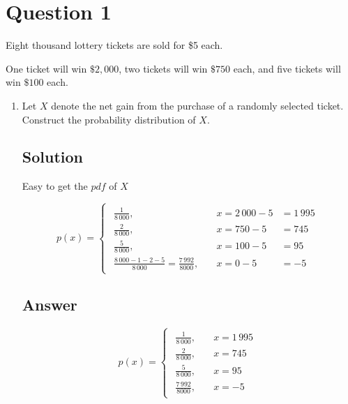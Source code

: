 \documentclass[12pt]{article}
\begin{document}
	
	\section*{Question 1}
	
	\noindent Eight thousand lottery tickets are sold for \$5 each.

	\bigskip
	
	\noindent One ticket will win $\$2,000$, two tickets will win $\$750$ each, and five tickets will win $\$100$ each.
	
	\bigskip
	
	\begin{enumerate}[start=1,label={\bfseries Part \arabic*:},leftmargin=0in]
		\bigskip\item Let $X$ denote the net gain from the purchase of a randomly selected ticket. Construct the probability distribution of $X$.
		
		\subsection*{Solution}
		
			Easy to get the $pdf$ of $X$
			
			\[
				p(x) =
				\begin{cases}
					\begin{aligned}
						\frac{1}{8\,000},&\quad x = 2\,000 - 5 &= 1\,995\\
						\frac{2}{8\,000},&\quad x = 750 - 5 &= 745\\
						\frac{5}{8\,000},&\quad x = 100 - 5 &= 95\\
						\frac{8\,000 - 1 - 2 - 5}{8\,000} = \frac{7\,992}{8000},&\quad x = 0 - 5 &= -5
					\end{aligned}
				\end{cases}
			\]
		
		\subsection*{Answer}
		
			\[\boxed{p(x) =
				\begin{cases}
					\begin{aligned}
						\frac{1}{8\,000},&\quad x = 1\,995\\
						\frac{2}{8\,000},&\quad x = 745\\
						\frac{5}{8\,000},&\quad x = 95\\
						\frac{7\,992}{8000},&\quad x = -5
					\end{aligned}
			\end{cases}}\]
		

\end{enumerate}
\end{document}
